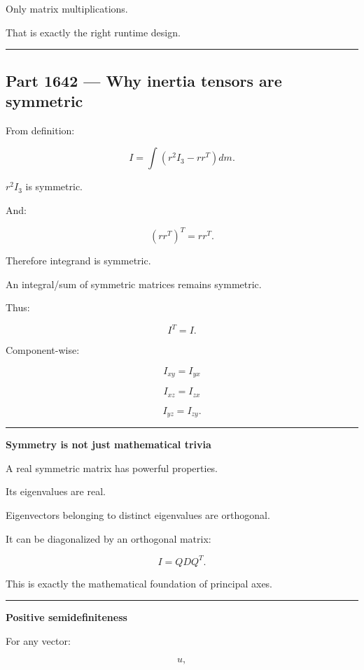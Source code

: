 Only matrix multiplications.

That is exactly the right runtime design.

\begin{center}\rule{0.5\linewidth}{0.5pt}\end{center}

\subsection{Part 1642 --- Why inertia tensors are symmetric}\label{06-engine-ii-ch035-part-1642-why-inertia-tensors-are-symmetric}

From definition:

\[
I
=
\int
(
r^2I_3
-
rr^T
)
dm.
\]

\(r^2I_3\) is symmetric.

And:

\[
(rr^T)^T
=
rr^T.
\]

Therefore integrand is symmetric.

An integral/sum of symmetric matrices remains symmetric.

Thus:

\[
\boxed{
I^T=I.
}
\]

Component-wise:

\[
I_{xy}=I_{yx}
\]

\[
I_{xz}=I_{zx}
\]

\[
I_{yz}=I_{zy}.
\]

\begin{center}\rule{0.5\linewidth}{0.5pt}\end{center}

\textbf{Symmetry is not just mathematical trivia}

A real symmetric matrix has powerful properties.

Its eigenvalues are real.

Eigenvectors belonging to distinct eigenvalues are orthogonal.

It can be diagonalized by an orthogonal matrix:

\[
I=QDQ^T.
\]

This is exactly the mathematical foundation of principal axes.

\begin{center}\rule{0.5\linewidth}{0.5pt}\end{center}

\textbf{Positive semidefiniteness}

For any vector:

\[
u,
\]


